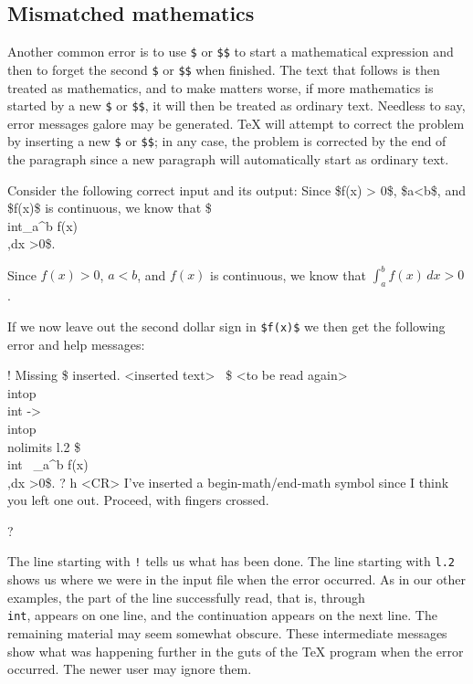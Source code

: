 \subsection{Mismatched mathematics} 

Another common error is to use {\tt \$} or {\tt \$\$} to start a 
mathematical expression and then to forget the second {\tt \$} 
or {\tt \$\$} when finished.  The text that follows is then 
treated as mathematics, and to make matters worse, if more 
mathematics is started by a new {\tt \$} or {\tt \$\$}, it will 
then be treated as ordinary text.  Needless to say, error 
messages galore may be generated. \TeX{} will attempt to correct 
the problem by inserting a new {\tt \$} or {\tt \$\$}; in any 
case, the problem is corrected by the end of the paragraph since 
a new paragraph will automatically start as ordinary text. 

Consider the following correct input and its output: 
\beginuser 
Since \$f(x) > 0\$, \$a<b\$,  and \$f(x)\$ is continuous, we know that 
\$\\int\_{}a\^{}b f(x)\\,dx >0\$. 
\enduser 

Since $f(x) > 0$, $a<b$,  and $f(x)$ is continuous, we know that 
$\int_a^b f(x)\,dx >0$. 

If we now leave out the second dollar sign in {\tt \$f(x)\$} we 
then get the following error and help messages: 

\beginuser \obeyspaces 
! Missing \$ inserted. 
<inserted text> 
\               \$ 
<to be read again> 
\                  \\intop 
\\int ->\\intop 
\             \\nolimits 
l.2 \$\\int 
\          \_{}a\^{}b f(x)\\,dx >0\$. 
? h <CR> 
I've inserted a begin-math/end-math symbol since I think 
you left one out. Proceed, with fingers crossed. 

? 
\enduser 

The line starting with {\tt !} tells us what has been done. The 
line starting with {\tt l.2} shows us where we were in the input 
file when the error occurred.  As in our other examples, the part 
of the line successfully read, that is, through {\tt \\int}, 
appears on one line, and the continuation appears on the next 
line. The remaining material may seem somewhat obscure.  These 
intermediate messages show what was happening further in the guts 
of the \TeX{} program when the error occurred.  The newer user 
may ignore them. 

